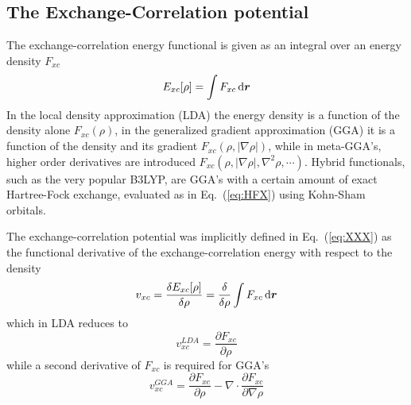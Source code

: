 \subsection{The Exchange-Correlation potential}
The exchange-correlation energy functional is given as an integral over an energy
density $F_{xc}$
\begin{equation}
    E_{xc}[\rho] = \int F_{xc}\,\mathrm{d} \boldsymbol r
\end{equation}
In the local density approximation (LDA) the energy density is a function of the density 
alone $F_{xc}(\rho)$, in the generalized gradient approximation (GGA) it is a function of
the density and its gradient $F_{xc}(\rho, |\nabla\rho|)$, while in meta-GGA's, higher order 
derivatives are introduced $F_{xc}(\rho, |\nabla\rho|, \nabla^2\rho, \cdots)$. Hybrid 
functionals, such as the very popular B3LYP\cite{B3LYP}, are GGA's with a certain amount of
exact Hartree-Fock exchange, evaluated as in Eq.~(\ref{eq:HFX}) using Kohn-Sham orbitals.

The exchange-correlation potential was implicitly defined in Eq.~(\ref{eq:XXX}) as the
functional derivative of the exchange-correlation energy with respect to the density
\begin{equation}
    v_{xc} = \frac{\delta E_{xc}[\rho]}{\delta \rho} 
	= \frac{\delta}{\delta \rho} \int F_{xc} \,\mathrm{d} \boldsymbol r
\end{equation}
which in LDA reduces to
\begin{equation}
    v_{xc}^{LDA} = \frac{\partial F_{xc}}{\partial \rho}
\end{equation}
while a second derivative of $F_{xc}$ is required for GGA's
\begin{equation}
    v_{xc}^{GGA} = \frac{\partial F_{xc}}{\partial \rho} - 
	\nabla\cdot\frac{\partial F_{xc}}{\partial\nabla\rho}
\end{equation}

